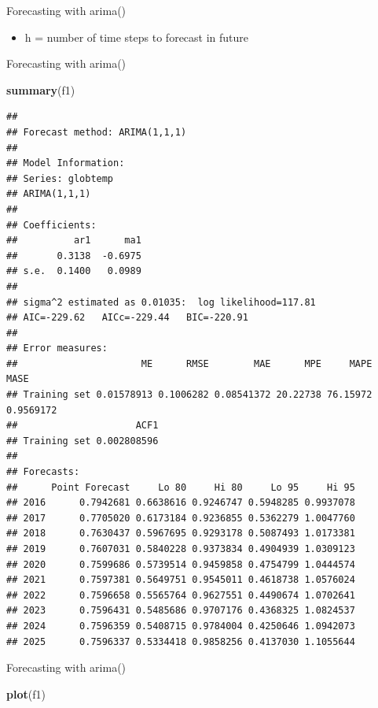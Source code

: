 \documentclass[ignorenonframetext,]{beamer}
\newenvironment{Shaded}{\begin{snugshade}}{\end{snugshade}}
\newcommand{\KeywordTok}[1]{\textcolor[rgb]{0.13,0.29,0.53}{\textbf{#1}}}
\newcommand{\NormalTok}[1]{#1}
\providecommand{\tightlist}{%
  \setlength{\itemsep}{0pt}\setlength{\parskip}{0pt}}
\begin{document}
\begin{frame}[fragile]
\begin{block}{Forecasting with arima()}
\begin{itemize}
\tightlist
\item
  h = number of time steps to forecast in future
\end{itemize}

\end{block}

\begin{block}{Forecasting with arima()}

\begin{Shaded}
\begin{Highlighting}[]
\KeywordTok{summary}\NormalTok{(f1)}
\end{Highlighting}
\end{Shaded}

\begin{verbatim}
## 
## Forecast method: ARIMA(1,1,1)
## 
## Model Information:
## Series: globtemp 
## ARIMA(1,1,1) 
## 
## Coefficients:
##          ar1      ma1
##       0.3138  -0.6975
## s.e.  0.1400   0.0989
## 
## sigma^2 estimated as 0.01035:  log likelihood=117.81
## AIC=-229.62   AICc=-229.44   BIC=-220.91
## 
## Error measures:
##                      ME      RMSE        MAE      MPE     MAPE      MASE
## Training set 0.01578913 0.1006282 0.08541372 20.22738 76.15972 0.9569172
##                     ACF1
## Training set 0.002808596
## 
## Forecasts:
##      Point Forecast     Lo 80     Hi 80     Lo 95     Hi 95
## 2016      0.7942681 0.6638616 0.9246747 0.5948285 0.9937078
## 2017      0.7705020 0.6173184 0.9236855 0.5362279 1.0047760
## 2018      0.7630437 0.5967695 0.9293178 0.5087493 1.0173381
## 2019      0.7607031 0.5840228 0.9373834 0.4904939 1.0309123
## 2020      0.7599686 0.5739514 0.9459858 0.4754799 1.0444574
## 2021      0.7597381 0.5649751 0.9545011 0.4618738 1.0576024
## 2022      0.7596658 0.5565764 0.9627551 0.4490674 1.0702641
## 2023      0.7596431 0.5485686 0.9707176 0.4368325 1.0824537
## 2024      0.7596359 0.5408715 0.9784004 0.4250646 1.0942073
## 2025      0.7596337 0.5334418 0.9858256 0.4137030 1.1055644
\end{verbatim}

\end{block}

\begin{block}{Forecasting with arima()}

\begin{Shaded}
\begin{Highlighting}[]
\KeywordTok{plot}\NormalTok{(f1)}
\end{Highlighting}
\end{Shaded}


\end{block}
\end{frame}
\end{document}
